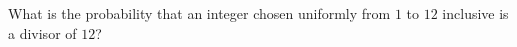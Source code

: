 What is the probability that an integer chosen uniformly from $1$ to $12$ inclusive is a divisor of $12$?
